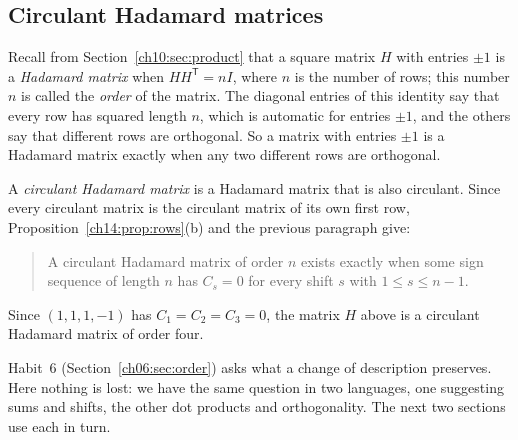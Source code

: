 \subsection*{Circulant Hadamard matrices}
Recall from Section~\ref{ch10:sec:product} that a square matrix $H$ with entries $\pm1$ is a \emph{Hadamard matrix} when $HH^{\mathsf T}=nI$, where $n$ is the number of rows; this number $n$ is called the \emph{order} of the matrix. The diagonal entries of this identity say that every row has squared length $n$, which is automatic for entries $\pm1$, and the others say that different rows are orthogonal. So a matrix with entries $\pm1$ is a Hadamard matrix exactly when any two different rows are orthogonal.

A \emph{circulant Hadamard matrix} is a Hadamard matrix that is also circulant. Since every circulant matrix is the circulant matrix of its own first row, Proposition~\ref{ch14:prop:rows}(b) and the previous paragraph give:
\begin{quote}
A circulant Hadamard matrix of order $n$ exists exactly when some sign sequence of length $n$ has $C_s=0$ for every shift $s$ with $1\le s\le n-1$.
\end{quote}
Since $(1,1,1,-1)$ has $C_1=C_2=C_3=0$, the matrix $H$ above is a circulant Hadamard matrix of order four.

Habit~6 (Section~\ref{ch06:sec:order}) asks what a change of description preserves. Here nothing is lost: we have the same question in two languages, one suggesting sums and shifts, the other dot products and orthogonality. The next two sections use each in turn.
